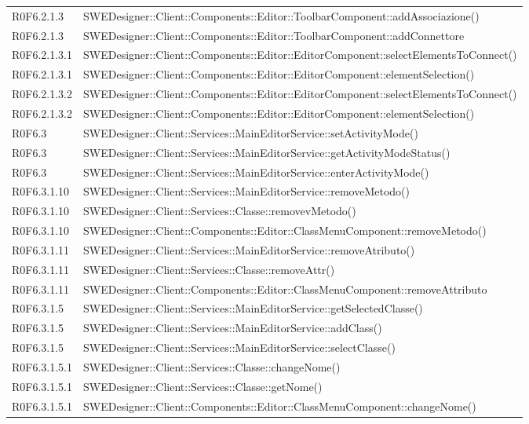 \begin{center}
\begin{longtable}{p{2cm}!{\VRule[1pt]}p{13cm}}
R0F6.2.1.3 & SWEDesigner::Client::Components::Editor::ToolbarComponent::addAssociazione()\\
R0F6.2.1.3 & SWEDesigner::Client::Components::Editor::ToolbarComponent::addConnettore\\
R0F6.2.1.3.1 & SWEDesigner::Client::Components::Editor::EditorComponent::selectElementsToConnect()\\
R0F6.2.1.3.1 & SWEDesigner::Client::Components::Editor::EditorComponent::elementSelection()\\
R0F6.2.1.3.2 & SWEDesigner::Client::Components::Editor::EditorComponent::selectElementsToConnect()\\
R0F6.2.1.3.2 & SWEDesigner::Client::Components::Editor::EditorComponent::elementSelection()\\
R0F6.3 & SWEDesigner::Client::Services::MainEditorService::setActivityMode()\\
R0F6.3 & SWEDesigner::Client::Services::MainEditorService::getActivityModeStatus()\\
R0F6.3 & SWEDesigner::Client::Services::MainEditorService::enterActivityMode()\\
R0F6.3.1.10 & SWEDesigner::Client::Services::MainEditorService::removeMetodo()\\
R0F6.3.1.10 & SWEDesigner::Client::Services::Classe::removevMetodo()\\
R0F6.3.1.10 & SWEDesigner::Client::Components::Editor::ClassMenuComponent::removeMetodo()\\
R0F6.3.1.11 & SWEDesigner::Client::Services::MainEditorService::removeAtributo()\\
R0F6.3.1.11 & SWEDesigner::Client::Services::Classe::removeAttr()\\
R0F6.3.1.11 & SWEDesigner::Client::Components::Editor::ClassMenuComponent::removeAttributo\\
R0F6.3.1.5 & SWEDesigner::Client::Services::MainEditorService::getSelectedClasse()\\
R0F6.3.1.5 & SWEDesigner::Client::Services::MainEditorService::addClass()\\
R0F6.3.1.5 & SWEDesigner::Client::Services::MainEditorService::selectClasse()\\
R0F6.3.1.5.1 & SWEDesigner::Client::Services::Classe::changeNome()\\
R0F6.3.1.5.1 & SWEDesigner::Client::Services::Classe::getNome()\\
R0F6.3.1.5.1 & SWEDesigner::Client::Components::Editor::ClassMenuComponent::changeNome()\\

\end{longtable}
\end{center}
